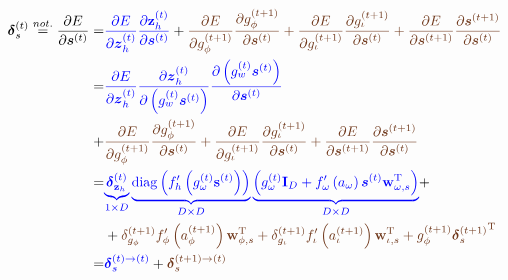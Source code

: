 \documentclass[11pt]{article}
\DeclareMathOperator{\diag}{diag}
\begin{document}
\begin{equation}
  \begin{split}
    \boldsymbol{\delta}_{s}^{(t)} \overset{not.}{=} \dfrac{\partial
      E}{\partial \boldsymbol{s}^{(t)}} = & {\color{blue}
      \dfrac{\partial E}{\partial \boldsymbol{z}_h^{(t)}}
      \dfrac{\partial \mathbf{z}_h^{(t)}}{\partial
        \boldsymbol{s}^{(t)}}} + {\color{auburn}\dfrac{\partial
        E}{\partial g_{\phi}^{(t+1)}} \dfrac{\partial
        g_{\phi}^{(t+1)}}{\partial \boldsymbol{s}^{(t)}} +
      \dfrac{\partial E}{\partial g_{\iota}^{(t+1)}} \dfrac{\partial
        g_{\iota}^{(t+1)}}{\partial \boldsymbol{s}^{(t)}} +
      \dfrac{\partial E}{\partial \boldsymbol{s}^{(t+1)}}
      \dfrac{\partial \boldsymbol{s}^{(t+1)}}{\partial
        \boldsymbol{s}^{(t)}}}
    \\
    = & {\color{blue}
      \dfrac{\partial E}{\partial \boldsymbol{z}_h^{(t)}}
      \dfrac{\partial \boldsymbol{z}_h^{(t)}}{\partial
        \left(g_w^{(t)} \boldsymbol{s}^{(t)} \right)}
      \dfrac{\partial
        \left(g_w^{(t)} \boldsymbol{s}^{(t)} \right)}
      {\partial \boldsymbol{s}^{(t)}}
    } \\ + & {\color{auburn}\dfrac{\partial
      E}{\partial g_{\phi}^{(t+1)}} \dfrac{\partial
      g_{\phi}^{(t+1)}}{\partial \boldsymbol{s}^{(t)}} +
    \dfrac{\partial E}{\partial g_{\iota}^{(t+1)}} \dfrac{\partial
      g_{\iota}^{(t+1)}}{\partial \boldsymbol{s}^{(t)}} +
    \dfrac{\partial E}{\partial \boldsymbol{s}^{(t+1)}}
    \dfrac{\partial \boldsymbol{s}^{(t+1)}}{\partial
      \boldsymbol{s}^{(t)}}}
  \\
  = & {\color{blue}
    \underbrace{\boldsymbol{\delta}_{\mathbf{z}_h}^{(t)}}_{1\times D}
    \underbrace{\diag\left(f_{h}'\left(g_{\omega}^{(t)}\mathbf{s}^{(t)}\right)\right)}_{D\times D}
    \underbrace{\left( g_{\omega}^{(t)} \mathbf{I}_{D} + f'_{\omega}\left(a_{\omega} \right) \boldsymbol{s}^{(t)}\mathbf{w}^{\text{T}}_{\omega, s} \right) }_{D \times D}} + \\
     & +
     {\color{auburn}\delta_{g_{\phi}}^{(t+1)}f_{\phi}'\left(a_{\phi}^{(t+1)}\right)\mathbf{w}_{\phi,
         s}^{\text{T}} +
       \delta_{g_{\iota}}^{(t+1)}f_{\iota}'\left(a_{\iota}^{(t+1)}\right)\mathbf{w}_{\iota,
         s}^{\text{T}} +
       g_{\phi}^{(t+1)}{\boldsymbol{\delta}_{s}^{(t+1)}}^{\text{T}}} \\
     = & {\color{blue}\boldsymbol{\delta}^{(t) \rightarrow (t)}_s} +
     {\color{auburn}\boldsymbol{\delta}^{(t+1) \rightarrow (t)}_s}
  \end{split}
\end{equation}
\end{document}
